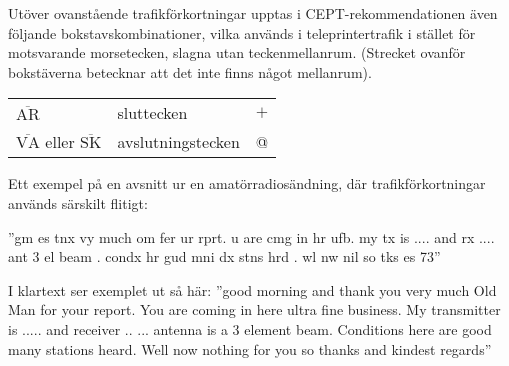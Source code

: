 Utöver ovanstående trafikförkortningar upptas i CEPT-rekommendationen
även följande bokstavskombinationer, vilka används i teleprintertrafik
i stället för motsvarande morsetecken, slagna utan teckenmellanrum.
(Strecket ovanför bokstäverna betecknar att det inte finns något mellanrum).

\begin{tabular}{lll}
  \(\overline{\mathrm{AR}}\) & sluttecken & \(+\) \\
  \(\overline{\mathrm{VA}}\) eller \(\overline{\mathrm{SK}}\) & avslutningstecken & @ \\
\end{tabular}

Ett exempel på en avsnitt ur en amatörradiosändning, där
trafikförkortningar används särskilt flitigt:

''gm es tnx vy much om fer ur rprt. u are cmg in hr ufb. my tx is
.... and rx .... ant 3 el beam . condx hr gud mni dx stns hrd . wl nw
nil so tks es 73''

I klartext ser exemplet ut så här: ''good morning and thank you very
much Old Man for your report.
You are coming in here ultra fine business.
My transmitter is .....  and receiver .. ... antenna is a 3 element beam.
Conditions here are good many stations heard.
Well now nothing for you so thanks and kindest regards''
